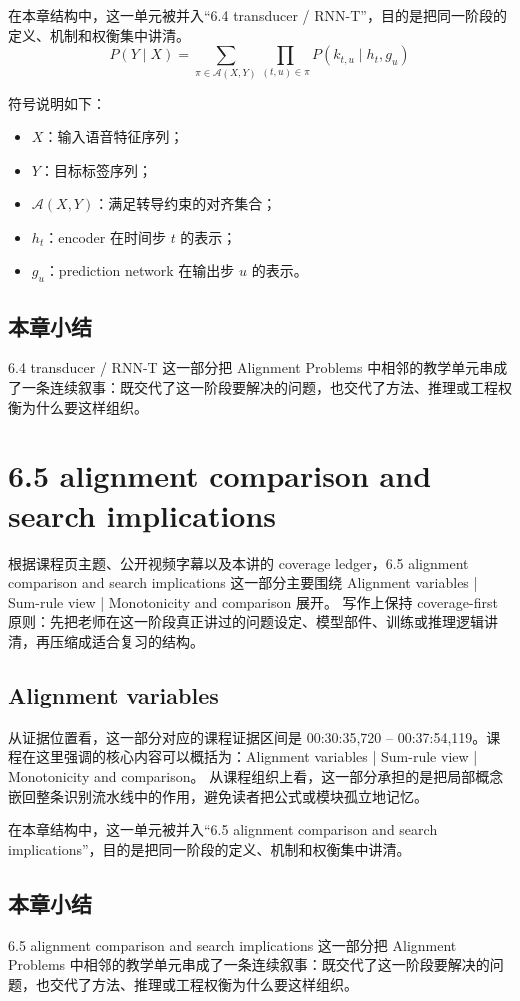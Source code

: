 \documentclass[a4paper]{article}
\begin{document}
在本章结构中，这一单元被并入“6.4 transducer / RNN-T”，目的是把同一阶段的定义、机制和权衡集中讲清。
\[
P(Y \mid X) = \sum_{\pi \in \mathcal{A}(X,Y)} \prod_{(t,u)\in\pi} P(k_{t,u} \mid h_t, g_u)
\]

符号说明如下：
\begin{itemize}
\item $X$：输入语音特征序列；
\item $Y$：目标标签序列；
\item $\mathcal{A}(X,Y)$：满足转导约束的对齐集合；
\item $h_t$：encoder 在时间步 $t$ 的表示；
\item $g_u$：prediction network 在输出步 $u$ 的表示。
\end{itemize}

\subsection{本章小结}
6.4 transducer / RNN-T 这一部分把 Alignment Problems 中相邻的教学单元串成了一条连续叙事：既交代了这一阶段要解决的问题，也交代了方法、推理或工程权衡为什么要这样组织。

\section{6.5 alignment comparison and search implications}
根据课程页主题、公开视频字幕以及本讲的 coverage ledger，6.5 alignment comparison and search implications 这一部分主要围绕 Alignment variables | Sum-rule view | Monotonicity and comparison 展开。
写作上保持 coverage-first 原则：先把老师在这一阶段真正讲过的问题设定、模型部件、训练或推理逻辑讲清，再压缩成适合复习的结构。

\subsection{Alignment variables}
从证据位置看，这一部分对应的课程证据区间是 00:30:35,720 -- 00:37:54,119。课程在这里强调的核心内容可以概括为：Alignment variables | Sum-rule view | Monotonicity and comparison。
从课程组织上看，这一部分承担的是把局部概念嵌回整条识别流水线中的作用，避免读者把公式或模块孤立地记忆。

在本章结构中，这一单元被并入“6.5 alignment comparison and search implications”，目的是把同一阶段的定义、机制和权衡集中讲清。

\subsection{本章小结}
6.5 alignment comparison and search implications 这一部分把 Alignment Problems 中相邻的教学单元串成了一条连续叙事：既交代了这一阶段要解决的问题，也交代了方法、推理或工程权衡为什么要这样组织。
\end{document}
